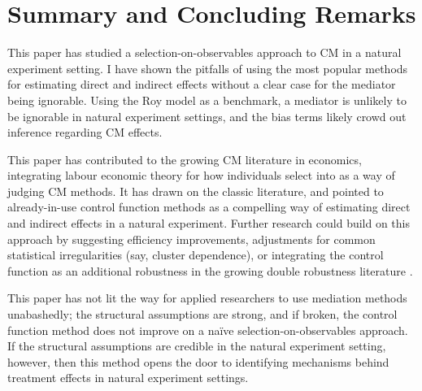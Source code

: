 \section{Summary and Concluding Remarks}
\label{sec:conclusion}

This paper has studied a selection-on-observables approach to CM in a natural experiment setting.
I have shown the pitfalls of using the most popular methods for estimating direct and indirect effects without a clear case for the mediator being ignorable.
Using the Roy model as a benchmark, a mediator is unlikely to be ignorable in natural experiment settings, and the bias terms likely crowd out inference regarding CM effects.

This paper has contributed to the growing CM literature in economics, integrating labour economic theory for how individuals select into as a way of judging CM methods.
It has drawn on the classic literature, and pointed to already-in-use control function methods as a compelling way of estimating direct and indirect effects in a natural experiment.
Further research could build on this approach by suggesting efficiency improvements, adjustments for common statistical irregularities (say, cluster dependence), or integrating the control function as an additional robustness in the growing double robustness literature \citep{huber2019review,bia2024double}.

This paper has not lit the way for applied researchers to use mediation methods unabashedly; the structural assumptions are strong, and if broken, the control function method does not improve on a na\"ive selection-on-observables approach.
If the structural assumptions are credible in the natural experiment setting, however, then this method opens the door to identifying mechanisms behind treatment effects in natural experiment settings.
